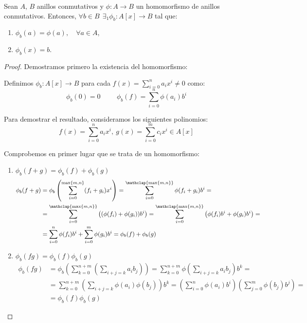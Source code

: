 \begin{teo}
    Sean $A$, $B$ anillos conmutativos y $\phi:A\longrightarrow B$ un homomorfismo de anillos conmutativos. Entonces, $\forall b \in B~~\exists_1 \phi_b:A[x]\longrightarrow B$ tal que:
    \begin{enumerate}
        \item $\phi_b(a) = \phi(a), \quad \forall a\in A$,
        \item $\phi_b(x) = b$.
    \end{enumerate}
\end{teo}
\begin{proof}
    Demostramos primero la existencia del homomorfismo:

    
    Definimos $\phi_b:A[x]\longrightarrow B$ para cada $f(x) = \sum\limits_{i=0}^n a_i x^i \neq 0$ como:
    \begin{equation*}
        \phi_b(0) = 0 \hspace{1cm} \phi_b(f) = \sum_{i=0}^n \phi(a_i)b^i
    \end{equation*}
    
    Para demostrar el resultado, consideramos los siguientes polinomios: $$f(x) = \sum_{i=0}^n a_i x^i, ~g(x)=\sum_{i=0}^m c_i x^i \in A[x]$$

    Comprobemos en primer lugar que se trata de un homomorfismo:
    \begin{enumerate}
        \item $\phi_b(f+g) = \phi_b(f) + \phi_b(g)$
        \begin{equation*}
            \begin{split}
                \phi_b(f + g)
                &= \phi_b\left( \sum_{i=0}^{{\max\{m,n\}}} (f_i + g_i) x^i \right)
                =  \sum_{i=0}^{\mathclap{\max\{m,n\}}} \phi(f_i + g_i) b^i =\\
                &=\sum_{i=0}^{\mathclap{\max\{m,n\}}} \left( (\phi(f_i) + \phi(g_i)) b^i \right)
                = \sum_{i=0}^{\mathclap{\max\{m,n\}}} \left( \phi(f_i)b^i + \phi(g_i)b^i \right) =\\
                &= \sum_{i=0}^n \phi(f_i)b^i + \sum_{i=0}^m \phi(g_i)b^i
                = \phi_b(f) + \phi_b(g)
            \end{split}
        \end{equation*}

        \item $\phi_b(fg) = \phi_b(f)\phi_b(g)$
        \begin{equation*}
            \begin{split}
                \phi_b(fg)
                &= \phi_b\left( \sum_{k=0}^{n+m} \left( \sum_{i+j=k} a_i b_j \right) \right)
                = \sum_{k=0}^{n+m} \phi\left( \sum_{i+j=k} a_ib_j \right)b^k = \\
                &= \sum_{k=0}^{n+m}\left( \sum_{i+j=k} \phi(a_i)\phi(b_j) \right) b^k
                = \left( \sum_{i=0}^n \phi(a_i)b^i \right) \left( \sum_{j=0}^m \phi(b_j) b^j \right) =\\
                & = \phi_b(f)\phi_b(g)
            \end{split}
        \end{equation*}


\end{enumerate}
\end{proof}
